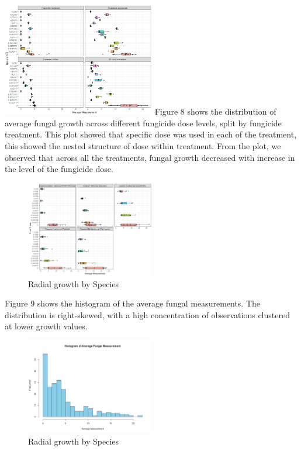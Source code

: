 \documentclass[
  10pt,
  letterpaper,
  twocolumn]{article}
\begin{document}
\includegraphics[width=0.5\textwidth,height=\textheight]{Fig7.jpeg}
Figure 8 shows the distribution of average fungal growth across
different fungicide dose levels, split by fungicide treatment. This plot
showed that specific dose was used in each of the treatment, this showed
the nested structure of dose within treatment. From the plot, we
observed that across all the treatments, fungal growth decreased with
increase in the level of the fungicide dose.

\begin{figure}

{\centering \includegraphics[width=0.5\textwidth,height=\textheight]{Fig8.jpeg}

}

\caption{Radial growth by Species}

\end{figure}

Figure 9 shows the histogram of the average fungal measurements. The
distribution is right-skewed, with a high concentration of observations
clustered at lower growth values.

\begin{figure}

{\centering \includegraphics[width=0.5\textwidth,height=\textheight]{Fig9.jpeg}

}

\caption{Radial growth by Species}

\end{figure}
\end{document}
